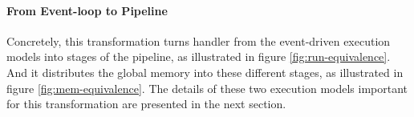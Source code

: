 











\paragraph{From Event-loop to Pipeline}

Concretely, this transformation turns handler from the event-driven execution models into stages of the pipeline, as illustrated in figure \ref{fig:run-equivalence}.
And it distributes the global memory  into these different stages, as illustrated in figure \ref{fig:mem-equivalence}.
The details of these two execution models important for this transformation are presented in the next section.

